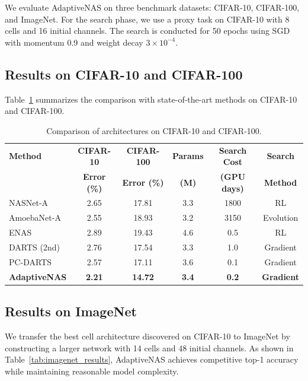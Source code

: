 \documentclass[12pt]{article}
\begin{document}
We evaluate AdaptiveNAS on three benchmark datasets: CIFAR-10, CIFAR-100, and ImageNet. For the search phase, we use a proxy task on CIFAR-10 with 8 cells and 16 initial channels. The search is conducted for 50 epochs using SGD with momentum 0.9 and weight decay $3 \times 10^{-4}$.

\subsection{Results on CIFAR-10 and CIFAR-100}

Table~\ref{tab:cifar_results} summarizes the comparison with state-of-the-art methods on CIFAR-10 and CIFAR-100.

\begin{table}[H]
\centering
\caption{Comparison of architectures on CIFAR-10 and CIFAR-100.}
\label{tab:cifar_results}
\begin{tabular}{@{}lccccc@{}}
\toprule
\textbf{Method} & \textbf{CIFAR-10} & \textbf{CIFAR-100} & \textbf{Params} & \textbf{Search Cost} & \textbf{Search}\\
 & \textbf{Error (\%)} & \textbf{Error (\%)} & \textbf{(M)} & \textbf{(GPU days)} & \textbf{Method} \\
\midrule
NASNet-A        & 2.65 & 17.81 & 3.3 & 1800 & RL \\
AmoebaNet-A     & 2.55 & 18.93 & 3.2 & 3150 & Evolution \\
ENAS            & 2.89 & 19.43 & 4.6 & 0.5  & RL \\
DARTS (2nd)     & 2.76 & 17.54 & 3.3 & 1.0  & Gradient \\
PC-DARTS        & 2.57 & 17.11 & 3.6 & 0.1  & Gradient \\
\midrule
\textbf{AdaptiveNAS} & \textbf{2.21} & \textbf{14.72} & \textbf{3.4} & \textbf{0.2} & \textbf{Gradient} \\
\bottomrule
\end{tabular}
\end{table}

\subsection{Results on ImageNet}

We transfer the best cell architecture discovered on CIFAR-10 to ImageNet by constructing a larger network with 14 cells and 48 initial channels. As shown in Table~\ref{tab:imagenet_results}, AdaptiveNAS achieves competitive top-1 accuracy while maintaining reasonable model complexity.
\end{document}
